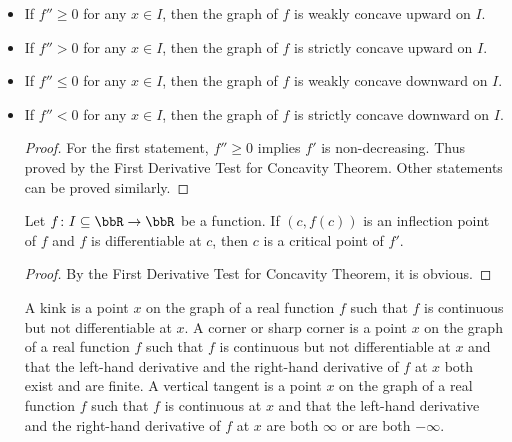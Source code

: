 \documentclass[a4paper,12pt]{report}
\begin{document}
\begin{itemize}
\begin{itemize}
\begin{proof}
    Let $a<b<c$ and $a,b,c\in I$. By MVT, there exists $A\in (a,b)$ such that
    \[f'(A)=\frac{f(b)-f(a)}{b-a},\]
    and there exists $B\in (b,c)$ such that
    \[f'(B)=\frac{f(c)-f(b)}{c-b}.\]
    Since $A<B$, $f'(A)\leq f'(B)$.
    \[\frac{f(b)-f(a)}{b-a}\leq\frac{f(c)-f(b)}{c-b}.\]
    \[(f(b)-f(a))(c-b)\leq(f(c)-f(b))(b-a).\]
    \[(c-a)f(b)\leq(b-a)f(c)+(c-b)f(a).\]
    \[f(b)\leq\frac{b-a}{c-a}f(c)+\frac{c-b}{c-a}f(a).\]
    Set
    \[\alpha=\frac{b-a}{c-a}\in(0,1).\]
    Then
    \[b=(1-\alpha)a+\alpha c.\]
    Thus the inequality becomes
    \[f\qty((1-\alpha)a+\alpha c)\leq(1-\alpha)f(a)+\alpha f(c).\]
    Other statements can be proved similarly.
\end{proof}
Let function $f\colon J\subseteq\mathbb{R}\to\mathbb{R}$ be twice differentiable on an open interval $I\subseteq J$.
\bit
\item If $f''\geq 0$ for any $x\in I$, then the graph of $f$ is weakly concave upward on $I$.
\item If $f''>0$ for any $x\in I$, then the graph of $f$ is strictly concave upward on $I$.
\item If $f''\leq 0$ for any $x\in I$, then the graph of $f$ is weakly concave downward on $I$.
\item If $f''<0$ for any $x\in I$, then the graph of $f$ is strictly concave downward on $I$.
\eit
\begin{proof}
For the first statement, $f''\geq 0$ implies $f'$ is non-decreasing. Thus proved by the First Derivative Test for Concavity Theorem. Other statements can be proved similarly.
\end{proof}
Let $f\colon I\subseteq\bbR\to\bbR$ be a function. If $(c,f(c))$ is an inflection point of $f$ and $f$ is differentiable at $c$, then $c$ is a critical point of $f'$.
\begin{proof}
By the First Derivative Test for Concavity Theorem, it is obvious.
\end{proof}
A kink is a point $x$ on the graph of a real function $f$ such that $f$ is continuous but not differentiable at $x$.
A corner or sharp corner is a point $x$ on the graph of a real function $f$ such that $f$ is continuous but not differentiable at $x$ and that the left-hand derivative and the right-hand derivative of $f$ at $x$ both exist and are finite.
A vertical tangent is a point $x$ on the graph of a real function $f$ such that $f$ is continuous at $x$ and that the left-hand derivative and the right-hand derivative of $f$ at $x$ are both $\infty$ or are both $-\infty$.

\end{itemize}
\end{itemize}
\end{document}
